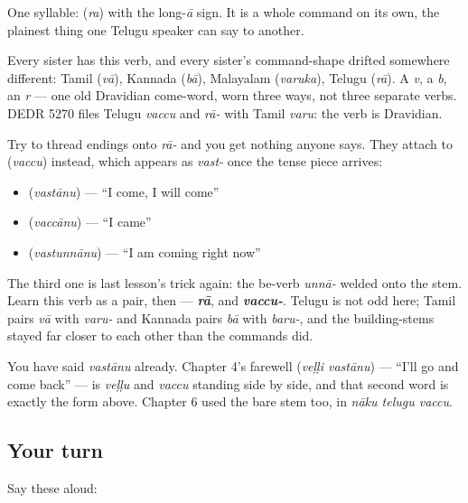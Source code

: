One syllable: \textbf{} (\emph{ra}) with the long-\emph{ā} sign. It is a whole command on its own, the plainest thing one Telugu speaker can say to another.

Every sister has this verb, and every sister's command-shape drifted somewhere different: Tamil \textbf{} (\emph{vā}), Kannada \textbf{} (\emph{bā}), Malayalam \textbf{} (\emph{varuka}), Telugu \textbf{} (\emph{rā}). A \emph{v}, a \emph{b}, an \emph{r} — one old Dravidian come-word, worn three ways, not three separate verbs. DEDR 5270 files Telugu \emph{vaccu} and \emph{rā-} with Tamil \emph{varu}: the verb is Dravidian.

\begin{grammarlens}[title={Grammar Lens: the word you call it by is not the word you build on}]
Try to thread endings onto \emph{rā-} and you get nothing anyone says. They attach to \textbf{} (\emph{vaccu}) instead, which appears as \emph{vast-} once the tense piece arrives:

\begin{itemize}
\raggedright
  \item \textbf{} (\emph{vastānu}) — \textquotedblleft{}I come, I will come\textquotedblright{}
  \item \textbf{} (\emph{vaccānu}) — \textquotedblleft{}I came\textquotedblright{}
  \item \textbf{} (\emph{vastunnānu}) — \textquotedblleft{}I am coming right now\textquotedblright{}
\end{itemize}

The third one is last lesson's trick again: the be-verb \emph{unnā-} welded onto the stem. Learn this verb as a pair, then — \emph{\textbf{rā}}, and \emph{\textbf{vaccu-}}. Telugu is not odd here; Tamil pairs \emph{vā} with \emph{varu-} and Kannada pairs \emph{bā} with \emph{baru-}, and the building-stems stayed far closer to each other than the commands did.

You have said \emph{vastānu} already. Chapter 4's farewell \textbf{ } (\emph{veḷḷi vastānu}) — \textquotedblleft{}I'll go and come back\textquotedblright{} — is \emph{veḷḷu} and \emph{vaccu} standing side by side, and that second word is exactly the form above. Chapter 6 used the bare stem too, in \emph{nāku telugu vaccu}.
\end{grammarlens}

\subsection*{Your turn}
Say these aloud:

